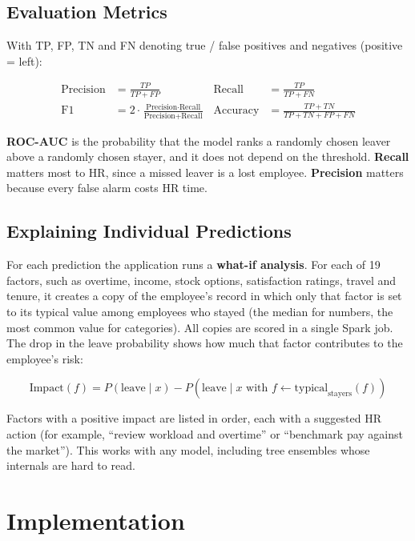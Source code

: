 \documentclass[12pt,a4paper]{report}
\begin{document}
\section{Evaluation Metrics}

With TP, FP, TN and FN denoting true / false positives and negatives (positive = left):

\begin{align*}
\text{Precision} &= \frac{TP}{TP + FP} & \text{Recall} &= \frac{TP}{TP + FN} \\[4pt]
\text{F1} &= 2\cdot\frac{\text{Precision}\cdot\text{Recall}}{\text{Precision} + \text{Recall}} & \text{Accuracy} &= \frac{TP + TN}{TP + TN + FP + FN}
\end{align*}

\textbf{ROC-AUC} is the probability that the model ranks a randomly chosen leaver above a randomly chosen stayer, and it does not depend on the threshold. \textbf{Recall} matters most to HR, since a missed leaver is a lost employee. \textbf{Precision} matters because every false alarm costs HR time.

\section{Explaining Individual Predictions}

For each prediction the application runs a \textbf{what-if analysis}. For each of 19 factors, such as overtime, income, stock options, satisfaction ratings, travel and tenure, it creates a copy of the employee's record in which only that factor is set to its typical value among employees who stayed (the median for numbers, the most common value for categories). All copies are scored in a single Spark job. The drop in the leave probability shows how much that factor contributes to the employee's risk:

\[
\text{Impact}(f) = P(\text{leave} \mid x) - P(\text{leave} \mid x \text{ with } f \leftarrow \text{typical}_{\text{stayers}}(f))
\]

Factors with a positive impact are listed in order, each with a suggested HR action (for example, ``review workload and overtime'' or ``benchmark pay against the market''). This works with any model, including tree ensembles whose internals are hard to read.


\chapter{Implementation}
\end{document}
